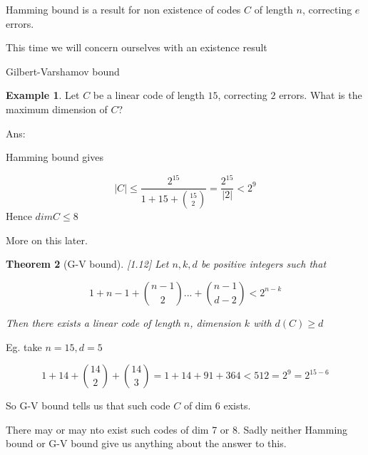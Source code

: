 \documentclass[amsfonts]{amsart}
\newtheorem{thm}{Theorem}[section]
\theoremstyle{definition}
\newtheorem{exmp}[thm]{Example}
\theoremstyle{remark}
\numberwithin{equation}{section}
\begin{document}
Hamming bound is a result for non existence of codes $C$ of length $n$, correcting $e$ errors.

This time we will concern ourselves with an existence result


Gilbert-Varshamov bound

\begin{exmp}
Let $C$ be a linear code of length $15$, correcting $2$ errors. What is the maximum dimension of $C$?

Ans:

Hamming bound gives

\[
	|C| \leq \frac{2^15}{1+15 +{15 \choose 2}} = \frac{2^15}{|2|} < 2^9
\]
Hence $dimC \leq 8$

More on this later.
\end{exmp}

\begin{thm}[G-V bound][1.12]
Let $n,k, d$ be positive integers such that

\[
	1 + n-1 + {n-1 \choose 2} ... + {n-1 \choose d-2} < 2^{n-k}
\]

Then there exists a linear code of length $n$, dimension $k$ with $d(C) \geq d$
\end{thm}

Eg. take $n=15, d=5$

\[
	1 + 14 + {14 \choose 2} + {14 \choose 3}  = 1 + 14 + 91 + 364 < 512 = 2^9 = 2^{15-6}
\]

So G-V bound tells us that such code $C$ of dim $6$ exists.

There may or may nto exist such codes of dim 7 or 8.
Sadly neither Hamming bound or G-V bound give us anything about the answer to this.
\end{document}

